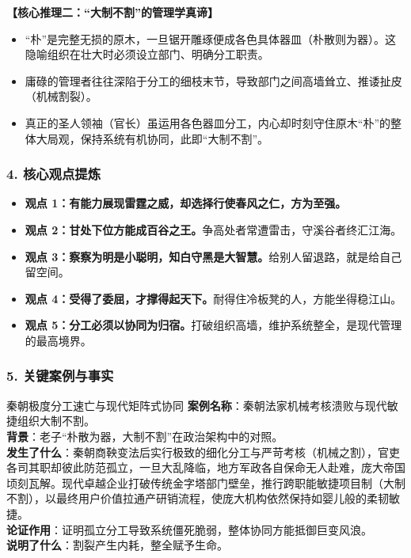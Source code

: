 \noindent\textbf{【核心推理二：“大制不割”的管理学真谛】}
\begin{itemize}
    \item “朴”是完整无损的原木，一旦锯开雕琢便成各色具体器皿（朴散则为器）。这隐喻组织在壮大时必须设立部门、明确分工职责。
    \item 庸碌的管理者往往深陷于分工的细枝末节，导致部门之间高墙耸立、推诿扯皮（机械割裂）。
    \item 真正的圣人领袖（官长）虽运用各色器皿分工，内心却时刻守住原木“朴”的整体大局观，保持系统有机协同，此即“大制不割”。
\end{itemize}

\subsubsection{4. 核心观点提炼}
\begin{itemize}
    \item \textbf{观点 1：有能力展现雷霆之威，却选择行使春风之仁，方为至强。}
    \item \textbf{观点 2：甘处下位方能成百谷之王。}争高处者常遭雷击，守溪谷者终汇江海。
    \item \textbf{观点 3：察察为明是小聪明，知白守黑是大智慧。}给别人留退路，就是给自己留空间。
    \item \textbf{观点 4：受得了委屈，才撑得起天下。}耐得住冷板凳的人，方能坐得稳江山。
    \item \textbf{观点 5：分工必须以协同为归宿。}打破组织高墙，维护系统整全，是现代管理的最高境界。
\end{itemize}

\subsubsection{5. 关键案例与事实}
\begin{CaseBox}{秦朝极度分工速亡与现代矩阵式协同}
\textbf{案例名称}：秦朝法家机械考核溃败与现代敏捷组织大制不割。\\
\textbf{背景}：老子“朴散为器，大制不割”在政治架构中的对照。\\
\textbf{发生了什么}：秦朝商鞅变法后实行极致的细化分工与严苛考核（机械之割），官吏各司其职却彼此防范孤立，一旦大乱降临，地方军政各自保命无人赴难，庞大帝国顷刻瓦解。现代卓越企业打破传统金字塔部门壁垒，推行跨职能敏捷项目制（大制不割），以最终用户价值拉通产研销流程，使庞大机构依然保持如婴儿般的柔韧敏捷。\\
\textbf{论证作用}：证明孤立分工导致系统僵死脆弱，整体协同方能抵御巨变风浪。\\
\textbf{说明了什么}：割裂产生内耗，整全赋予生命。
\end{CaseBox}

